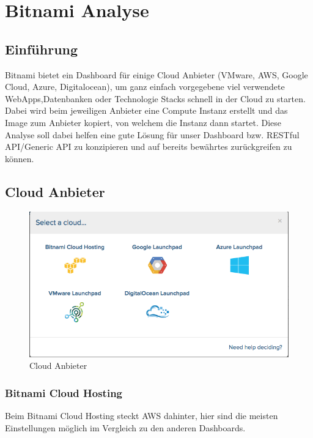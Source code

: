 \newpage
\section{Bitnami Analyse}
\subsection{Einführung}
 
Bitnami bietet ein Dashboard für einige Cloud Anbieter (VMware, AWS, Google Cloud, Azure, 
Digitalocean), um ganz einfach vorgegebene viel verwendete WebApps,Datenbanken oder Technologie Stacks 
schnell in der Cloud zu starten.
Dabei wird beim jeweiligen Anbieter eine Compute Instanz erstellt und das Image zum Anbieter kopiert, 
von welchem die Instanz dann startet.
Diese Analyse soll dabei helfen eine gute Lösung für unser Dashboard bzw. RESTful API/Generic API zu 
konzipieren und auf bereits bewährtes zurückgreifen zu können.

\subsection{Cloud Anbieter}
\begin{figure}[!htbp]
\includegraphics[width=\textwidth]{./03_Analyse/03_Bitnami/images/clouds}
  \caption{Cloud Anbieter}
\end{figure}

\newpage
\subsubsection{Bitnami Cloud Hosting\autocite{aws}}

Beim Bitnami Cloud Hosting steckt AWS dahinter, hier sind die meisten 
Einstellungen möglich im Vergleich zu den anderen Dashboards.

